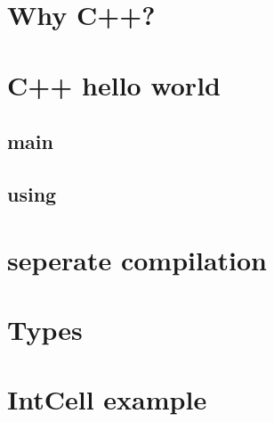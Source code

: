 
\begin{frame}
    \titlepage
\end{frame}

\section{Why C++?}





\section{C++ hello world}




\subsection{main}



\subsection{using}




\section{seperate compilation}







\section{Types}



\section{IntCell example}



